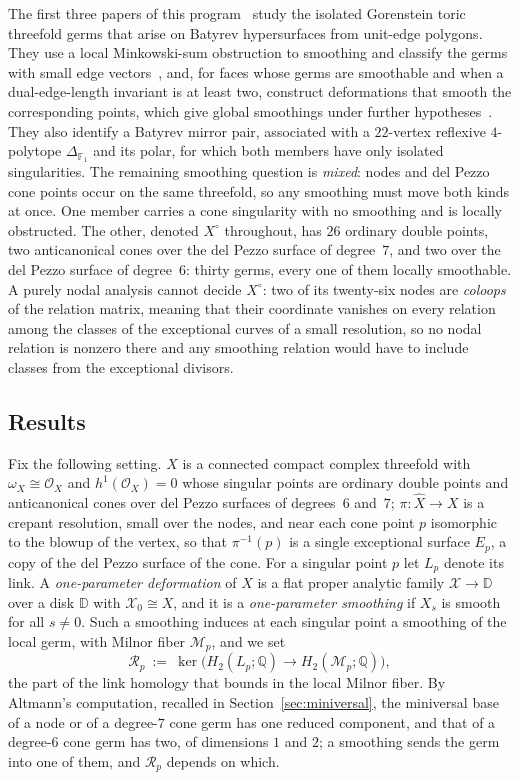 \documentclass[11pt]{amsart}
\theoremstyle{definition}
\theoremstyle{remark}
\theoremstyle{plain}
\newcommand{\QQ}{\mathbb{Q}}
\newcommand{\cO}{\mathcal{O}}
\newcommand{\Rsm}{\mathcal{R}}   %
\newcommand{\Mil}{\mathcal{M}}  %
\newcommand{\cX}{\mathcal{X}}
\newcommand{\Xh}{\widehat{X}}
\newcommand{\Disk}{\mathbb{D}}
\begin{document}
The first three papers of this program~\cite{PaperI,PaperII,PaperIII}
study the isolated Gorenstein toric threefold germs that arise on Batyrev
hypersurfaces from unit-edge polygons.  They use a local Minkowski-sum
obstruction to smoothing and classify the germs with small edge
vectors~\cite{PaperI}, and, for faces whose germs are smoothable and when a
dual-edge-length invariant is at least two, construct deformations that
smooth the corresponding points, which give global
smoothings under further hypotheses~\cite{PaperII}.  They also identify a
Batyrev mirror pair, associated with a $22$-vertex reflexive $4$-polytope
$\Delta_{\mathbb F_1}$ and its polar, for which both members have only isolated
singularities.  The remaining smoothing question is \emph{mixed}: nodes and
del Pezzo cone points occur on the same threefold, so any smoothing must move
both kinds at once.  One member carries a cone singularity with no smoothing
and is locally obstructed.  The other, denoted $X^{\circ}$ throughout, has
$26$ ordinary double points, two
anticanonical cones over the del Pezzo surface of degree~$7$, and two
over the del Pezzo surface of degree~$6$: thirty germs, every one of
them locally smoothable.  A purely nodal analysis cannot decide
$X^{\circ}$: two of its twenty-six nodes are \emph{coloops} of the relation
matrix, meaning that their coordinate vanishes on every relation among the
classes of the exceptional curves of a small resolution, so no nodal relation is
nonzero there and any smoothing relation would have to include classes
from the exceptional divisors.

\subsection{Results}
Fix the following setting.  $X$ is a connected compact complex threefold with
$\omega_X\cong\cO_X$ and $h^1(\cO_X)=0$ whose singular points are
ordinary double points and anticanonical cones over del Pezzo surfaces
of degrees~$6$ and~$7$; $\pi\colon\Xh\to X$ is a crepant resolution,
small over the nodes, and near each cone point $p$ isomorphic to the
blowup of the vertex, so that $\pi^{-1}(p)$ is a single exceptional
surface $E_p$, a copy of the del Pezzo surface of the cone.  For a singular point $p$ let $L_p$ denote
its link.  A \emph{one-parameter deformation} of $X$ is a flat proper
analytic family $\cX\to\Disk$ over a disk $\Disk$ with
$\cX_0\cong X$, and it is a \emph{one-parameter smoothing} if $X_s$ is
smooth for all $s\neq0$.  Such a smoothing induces at each singular
point a smoothing of the local germ, with Milnor fiber $\Mil_p$, and we
set
\[
\Rsm_p\ :=\ \ker\bigl(H_2(L_p;\QQ)\longrightarrow H_2(\Mil_p;\QQ)\bigr),
\]
the part of the link homology that bounds in the local Milnor fiber.  By
Altmann's computation, recalled in Section~\ref{sec:miniversal}, the miniversal
base of a node or of a degree-$7$ cone germ has one reduced component, and that
of a degree-$6$ cone germ has two, of dimensions $1$ and $2$; a smoothing sends
the germ into one of them, and $\Rsm_p$ depends on which.
\end{document}
